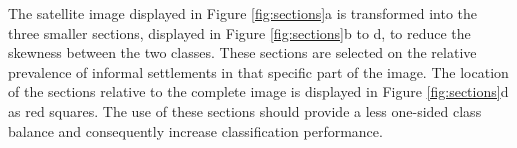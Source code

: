 The satellite image displayed in Figure \ref{fig:sections}a is transformed into the three smaller sections, displayed in Figure \ref{fig:sections}b to d, to reduce the skewness between the two classes. These sections are selected on the relative prevalence of informal settlements in that specific part of the image. The location of the sections relative to the complete image is displayed in Figure \ref{fig:sections}d as red squares. The use of these sections should provide a less one-sided class balance and consequently increase classification performance. 


